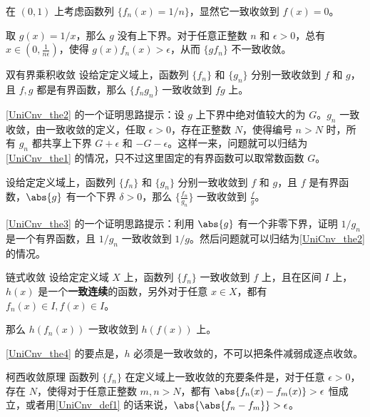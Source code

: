 \begin{example}{}\label{UniCnv_ex3}
在 $(0, 1)$ 上考虑函数列 $\{f_n(x)=1/n\}$，显然它一致收敛到 $f(x)=0$。

取 $g(x)=1/x$，那么 $g$ 没有上下界。对于任意正整数 $n$ 和 $\epsilon>0$，总有 $x\in(0, \frac{1}{n\epsilon})$，使得 $g(x)f_n(x)>\epsilon$，从而 $\{gf_n\}$ 不一致收敛。
\end{example}

\begin{theorem}{双有界乘积收敛}\label{UniCnv_the2}
设给定定义域上，函数列 $\{f_n\}$ 和 $\{g_n\}$ 分别一致收敛到 $f$ 和 $g$，且 $f, g$ 都是有界函数，那么 $\{f_ng_n\}$ 一致收敛到 $fg$ 上。
\end{theorem}

\autoref{UniCnv_the2} 的一个证明思路提示：设 $g$ 上下界中绝对值较大的为 $G$。$g_n$ 一致收敛，由一致收敛的定义，任取 $\epsilon>0$，存在正整数 $N$，使得编号 $n>N$ 时，所有 $g_n$ 都共享上下界 $G+\epsilon$ 和 $-G-\epsilon$。这样一来，问题就可以归结为\autoref{UniCnv_the1} 的情况，只不过这里固定的有界函数可以取常数函数 $G$。

\begin{theorem}{}\label{UniCnv_the3}
设给定定义域上，函数列 $\{f_n\}$ 和 $\{g_n\}$ 分别一致收敛到 $f$ 和 $g$，且 $f$ 是有界函数，$\abs{g}$ 有一个下界 $\delta>0$，那么 $\{\frac{f_n}{g_n}\}$ 一致收敛到 $\frac{f}{g}$。
\end{theorem}

\autoref{UniCnv_the3} 的一个证明思路提示：利用 $\abs{g}$ 有一个非零下界，证明 $1/g_n$ 是一个有界函数，且 $1/g_n$ 一致收敛到 $1/g$。然后问题就可以归结为\autoref{UniCnv_the2} 的情况。

\begin{theorem}{链式收敛}\label{UniCnv_the4}
设给定定义域 $X$ 上，函数列 $\{f_n\}$ 一致收敛到 $f$ 上，且在区间 $I$ 上，$h(x)$ 是一个\textbf{一致连续}的函数，另外对于任意 $x\in X$，都有 $f_n(x)\in I, f(x)\in I$。

那么 $h(f_n(x))$ 一致收敛到 $h(f(x))$ 上。
\end{theorem}

\autoref{UniCnv_the4} 的要点是，$h$ 必须是一致收敛的，不可以把条件减弱成逐点收敛。

\begin{theorem}{柯西收敛原理}\label{UniCnv_the6}
函数列 $\{f_n\}$ 在定义域上一致收敛的充要条件是，对于任意 $\epsilon>0$，存在 $N$，使得对于任意正整数 $m, n>N$，都有 $\abs{f_n(x)-f_m(x)}>\epsilon$ 恒成立，或者用\autoref{UniCnv_def1} 的话来说，$\abs{\abs{f_n-f_m}}>\epsilon$。
\end{theorem}

